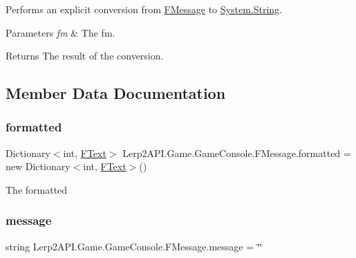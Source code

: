 Performs an explicit conversion from \hyperlink{class_lerp2_a_p_i_1_1_game_1_1_game_console_1_1_f_message}{F\+Message} to \hyperlink{namespace_lerp2_a_p_i_1_1_game_a2f182da062f210cc43f341f6992ee293a27118326006d3829667a400ad23d5d98}{System.\+String}. 


\begin{DoxyParams}{Parameters}
{\em fm} & The fm.\\
\hline
\end{DoxyParams}
\begin{DoxyReturn}{Returns}
The result of the conversion.
\end{DoxyReturn}


\subsection{Member Data Documentation}
\mbox{\label{class_lerp2_a_p_i_1_1_game_1_1_game_console_1_1_f_message_acc464c0f449366c179a9d8791942d406}} 
\subsubsection{\texorpdfstring{formatted}{formatted}}
{\footnotesize\ttfamily Dictionary$<$int, \hyperlink{class_lerp2_a_p_i_1_1_game_1_1_game_console_1_1_f_text}{F\+Text}$>$ Lerp2\+A\+P\+I.\+Game.\+Game\+Console.\+F\+Message.\+formatted = new Dictionary$<$int, \hyperlink{class_lerp2_a_p_i_1_1_game_1_1_game_console_1_1_f_text}{F\+Text}$>$()}



The formatted 

\mbox{\label{class_lerp2_a_p_i_1_1_game_1_1_game_console_1_1_f_message_aae4d078162de0b5a2b28bd036562f40e}} 
\subsubsection{\texorpdfstring{message}{message}}
{\footnotesize\ttfamily string Lerp2\+A\+P\+I.\+Game.\+Game\+Console.\+F\+Message.\+message = \char`\"{}\char`\"{}}



